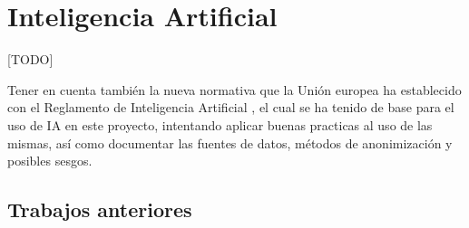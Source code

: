 \section{Inteligencia Artificial}

[TODO]

Tener en cuenta también la nueva normativa que la Unión europea ha establecido con el Reglamento de Inteligencia Artificial \citep{webRIA2024Europa}, el cual se ha tenido de base para el uso de IA en este proyecto, intentando aplicar buenas practicas al uso de las mismas, así como documentar las fuentes de datos, métodos de anonimización y posibles sesgos.
	
	\subsection{Trabajos anteriores}


